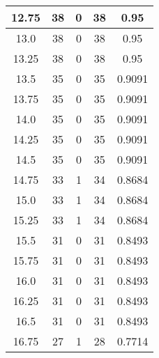 \documentclass[letterpaper, 12pt]{article}
\begin{document}
\begin{longtable}{|c|c|c|c|c|}
\hline
12.75 & 38 & 0 & 38 & 0.95 \\
\hline
13.0 & 38 & 0 & 38 & 0.95 \\
\hline
13.25 & 38 & 0 & 38 & 0.95 \\
\hline
13.5 & 35 & 0 & 35 & 0.9091 \\
\hline
13.75 & 35 & 0 & 35 & 0.9091 \\
\hline
14.0 & 35 & 0 & 35 & 0.9091 \\
\hline
14.25 & 35 & 0 & 35 & 0.9091 \\
\hline
14.5 & 35 & 0 & 35 & 0.9091 \\
\hline
14.75 & 33 & 1 & 34 & 0.8684 \\
\hline
15.0 & 33 & 1 & 34 & 0.8684 \\
\hline
15.25 & 33 & 1 & 34 & 0.8684 \\
\hline
15.5 & 31 & 0 & 31 & 0.8493 \\
\hline
15.75 & 31 & 0 & 31 & 0.8493 \\
\hline
16.0 & 31 & 0 & 31 & 0.8493 \\
\hline
16.25 & 31 & 0 & 31 & 0.8493 \\
\hline
16.5 & 31 & 0 & 31 & 0.8493 \\
\hline
16.75 & 27 & 1 & 28 & 0.7714 \\
\hline
\end{longtable}
\end{document}
